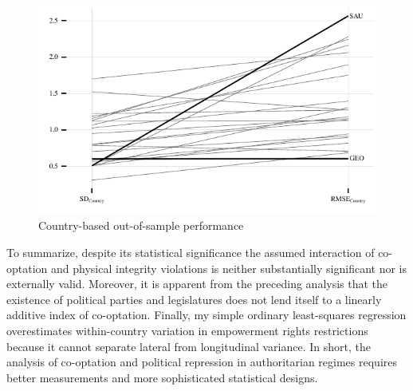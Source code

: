 \begin{figure}[!htb]
  \centering
  \includegraphics[width = \linewidth]{./sections/04extension/testSamplePred.pdf}
  \caption{Country-based out-of-sample performance}
  \label{fig:testSample}
\end{figure}

To summarize, despite its statistical significance the 
assumed interaction of co-optation and physical integrity 
violations is neither substantially significant nor is 
externally valid. Moreover, it is apparent from the 
preceding analysis that the existence of political parties 
and legislatures does not lend itself to a linearly additive
index of co-optation. Finally, my simple ordinary 
least-squares regression overestimates within-country 
variation in empowerment rights restrictions because it 
cannot separate lateral from longitudinal variance. In 
short, the analysis of co-optation and political repression 
in authoritarian regimes requires better measurements and 
more sophisticated statistical designs.